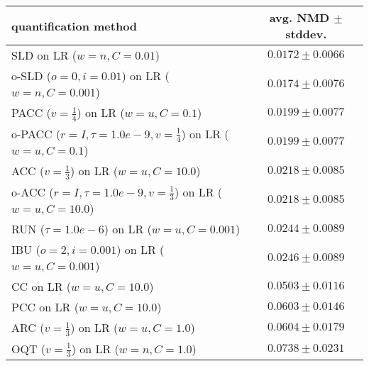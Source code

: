 \begin{tabular}{lc}
  \toprule
  quantification method & avg. NMD $\pm$ stddev. \\
  \midrule
  SLD on LR ($w=n, C=0.01$) & $\mathbf{0.0172 \pm 0.0066}$ \\
  o-SLD ($o=0, i=0.01$) on LR ($w=n, C=0.001$) & $\mathbf{0.0174 \pm 0.0076}$ \\
  PACC ($v=\frac{1}{4}$) on LR ($w=u, C=0.1$) & $0.0199 \pm 0.0077$ \\
  o-PACC ($r=I, \tau=1.0e-9, v=\frac{1}{4}$) on LR ($w=u, C=0.1$) & $0.0199 \pm 0.0077$ \\
  ACC ($v=\frac{1}{3}$) on LR ($w=u, C=10.0$) & $0.0218 \pm 0.0085$ \\
  o-ACC ($r=I, \tau=1.0e-9, v=\frac{1}{3}$) on LR ($w=u, C=10.0$) & $0.0218 \pm 0.0085$ \\
  RUN ($\tau=1.0e-6$) on LR ($w=u, C=0.001$) & $0.0244 \pm 0.0089$ \\
  IBU ($o=2, i=0.001$) on LR ($w=u, C=0.001$) & $0.0246 \pm 0.0089$ \\
  CC on LR ($w=u, C=10.0$) & $0.0503 \pm 0.0116$ \\
  PCC on LR ($w=u, C=10.0$) & $0.0603 \pm 0.0146$ \\
  ARC ($v=\frac{1}{3}$) on LR ($w=u, C=1.0$) & $0.0604 \pm 0.0179$ \\
  OQT ($v=\frac{1}{3}$) on LR ($w=n, C=1.0$) & $0.0738 \pm 0.0231$ \\
  \bottomrule
\end{tabular}
